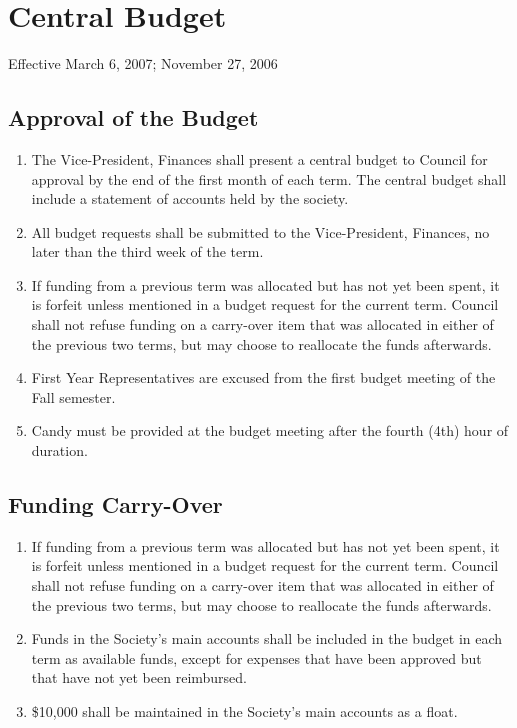 \section{Central Budget}
Effective March 6, 2007; November 27, 2006

\subsection{Approval of the Budget}
\begin{enumerate}
\item The Vice-President, Finances shall present a central budget to Council for approval by the end of the first month of each term. The central budget shall include a statement of accounts held by the society.
\item All budget requests shall be submitted to the Vice-President, Finances, no later than the third week of the term.
\item If funding from a previous term was allocated but has not yet been spent, it is forfeit unless mentioned in a budget request for the current term. Council shall not refuse funding on a carry-over item that was allocated in either of the previous two terms, but may choose to reallocate the funds afterwards.
\item First Year Representatives are excused from the first budget meeting of the Fall semester.
\item Candy must be provided at the budget meeting after the fourth (4th) hour of duration.
\end{enumerate}


\subsection{Funding Carry-Over}
\begin{enumerate}
\item If funding from a previous term was allocated but has not yet been spent, it is forfeit unless mentioned in a budget request for the current term. Council shall not refuse funding on a carry-over item that was allocated in either of the previous two terms, but may choose to reallocate the funds afterwards.
\item Funds in the Society's main accounts shall be included in the budget in each term as available funds, except for expenses that have been approved but that have not yet been reimbursed.
\item \$10,000 shall be maintained in the Society's main accounts as a float.
\end{enumerate}

